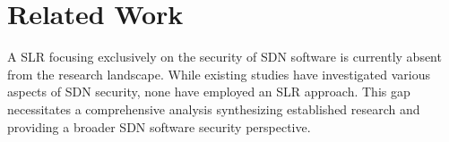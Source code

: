 \section{Related Work}
\label{sec:rw}
A SLR focusing exclusively on the security of SDN software is currently absent from the research landscape. While existing studies have investigated various aspects of SDN security, none have employed an SLR approach. This gap necessitates a comprehensive analysis synthesizing established research and providing a broader SDN software security perspective.


